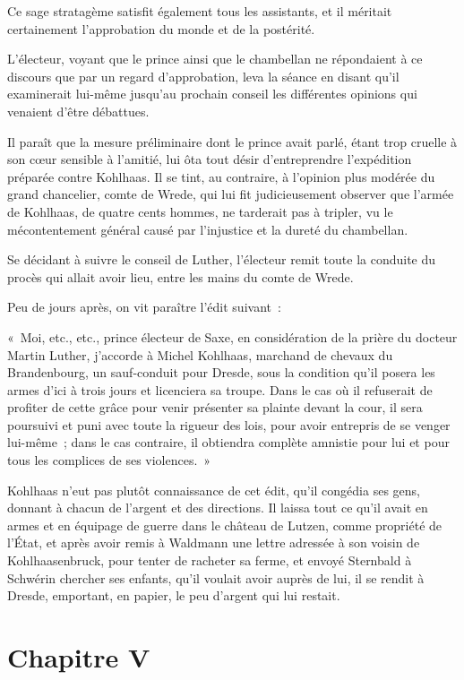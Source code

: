 \documentclass[french,twoside]{book} %
\newcommand\chapteropen{} %
\newcommand\chapterclose{} %
\begin{document}
Ce sage stratagème satisfit également tous les assistants, et il méritait certainement l’approbation du monde et de la postérité.\par
L’électeur, voyant que le prince ainsi que le chambellan ne répondaient à ce discours que par un regard d’approbation, leva la séance en disant qu’il examinerait lui-même jusqu’au prochain conseil les différentes opinions qui venaient d’être débattues.\par
Il paraît que la mesure préliminaire dont le prince avait parlé, étant trop cruelle à son cœur sensible à l’amitié, lui ôta tout désir d’entreprendre l’expédition préparée contre Kohlhaas. Il se tint, au contraire, à l’opinion plus modérée du grand chancelier, comte de Wrede, qui lui fit judicieusement observer que l’armée de Kohlhaas, de quatre cents hommes, ne tarderait pas à tripler, vu le mécontentement général causé par l’injustice et la dureté du chambellan.\par
Se décidant à suivre le conseil de Luther, l’électeur remit toute la conduite du procès qui allait avoir lieu, entre les mains du comte de Wrede.\par
Peu de jours après, on vit paraître l’édit suivant :\par
« Moi, etc., etc., prince électeur de Saxe, en considération de la prière du docteur Martin Luther, j’accorde à Michel Kohlhaas, marchand de chevaux du Brandenbourg, un sauf-conduit pour Dresde, sous la condition qu’il posera les armes d’ici à trois jours et licenciera sa troupe. Dans le cas où il refuserait de profiter de cette grâce pour venir présenter sa plainte devant la cour, il sera poursuivi et puni avec toute la rigueur des lois, pour avoir entrepris de se venger lui-même ; dans le cas contraire, il obtiendra complète amnistie pour lui et pour tous les complices de ses violences. »\par
Kohlhaas n’eut pas plutôt connaissance de cet édit, qu’il congédia ses gens, donnant à chacun de l’argent et des directions. Il laissa tout ce qu’il avait en armes et en équipage de guerre dans le château de Lutzen, comme propriété de l’État, et après avoir remis à Waldmann une lettre adressée à son voisin de Kohlhaasenbruck, pour tenter de racheter sa ferme, et envoyé Sternbald à Schwérin chercher ses enfants, qu’il voulait avoir auprès de lui, il se rendit à Dresde, emportant, en papier, le peu d’argent qui lui restait.
\chapterclose


\chapteropen
\chapter[Chapitre V]{Chapitre V}\renewcommand{\leftmark}{Chapitre V}
\end{document}
